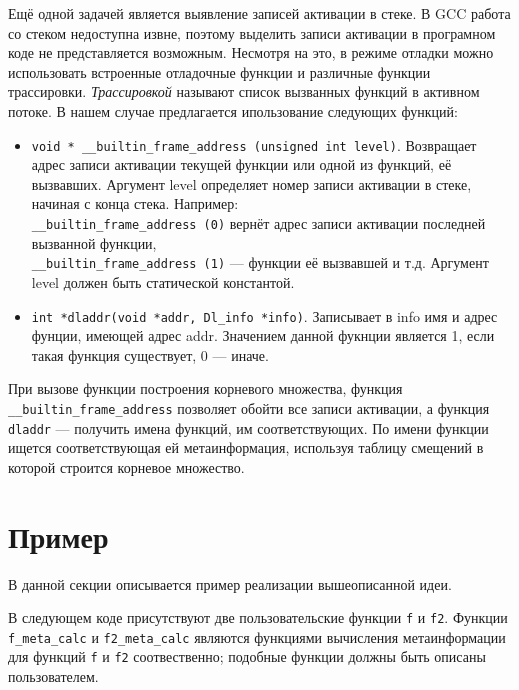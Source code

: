\documentclass{matmex-diploma}
\begin{document}
Ещё одной задачей является выявление записей активации в стеке. В GCC работа со стеком недоступна извне, поэтому выделить записи активации в програмном коде не представляется возможным. Несмотря на это, в режиме отладки можно использовать встроенные отладочные функции и различные функции трассировки. \textit{Трассировкой} называют список вызванных функций в активном потоке. В нашем случае предлагается ипользование следующих функций:
\begin{itemize}
\item \lstinline{void * __builtin_frame_address (unsigned int level)}. Возвращает адрес записи активации текущей функции или одной из функций, её вызвавших. Аргумент level определяет номер записи активации в стеке, начиная с конца стека. Например:\\
\lstinline{__builtin_frame_address (0)} вернёт адрес записи активации последней вызванной функции,\\
\lstinline{__builtin_frame_address (1)} --- функции её вызвавшей и т.д. Аргумент level должен быть статической константой.
\item \lstinline{int *dladdr(void *addr, Dl_info *info)}. Записывает в info имя и адрес фунции, имеющей адрес addr. Значением данной фукнции является 1, если такая функция существует, 0 --- иначе.
\end{itemize}
При вызове функции построения корневого множества, функция \lstinline{__builtin_frame_address} позволяет обойти все записи активации, а функция \lstinline{dladdr} --- получить имена функций, им соответствующих. По имени функции ищется соответствующая ей метаинформация, используя таблицу смещений в которой строится корневое множество.

\section{Пример}
В данной секции описывается пример реализации вышеописанной идеи.

В следующем коде присутствуют две пользовательские функции \lstinline{f} и \lstinline{f2}. Функции
\lstinline{f_meta_calc} и \lstinline{f2_meta_calc} являются функциями вычисления метаинформации для функций
\lstinline{f} и \lstinline{f2} соотвественно; подобные функции должны быть описаны пользователем.
\end{document}
